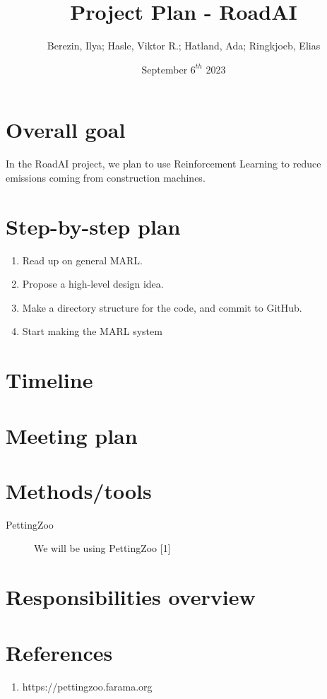 \documentclass{article}
\title{Project Plan - RoadAI}
\author{Berezin, Ilya; Hasle, Viktor R.; Hatland, Ada; Ringkjoeb, Elias}
\date{September $6^{th}$ 2023}
\begin{document}
\begin{titlepage}
\maketitle
\tableofcontents
\end{titlepage}


\section{Overall goal}
In the RoadAI project, we plan to use Reinforcement Learning to reduce emissions coming from
construction machines. 

\section{Step-by-step plan}
\begin{enumerate}
  \item Read up on general MARL.\\
  \item Propose a high-level design idea.\\
  \item Make a directory structure for the code, and commit to GitHub.\\
  \item Start making the MARL system
\end{enumerate}

\section{Timeline}

\section{Meeting plan}

\section{Methods/tools}
\begin{description}
  \item[PettingZoo] We will be using PettingZoo [1]
\end{description}


\section{Responsibilities overview}


\section*{References}
\begin{enumerate}
  \item https://pettingzoo.farama.org
\end{enumerate}
\end{document}
